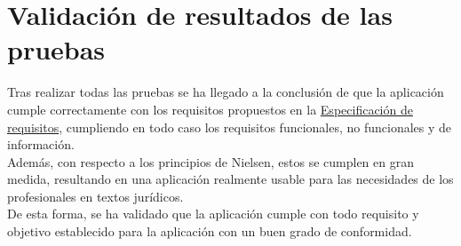 \section{Validación de resultados de las pruebas}

Tras realizar todas las pruebas se ha llegado a la conclusión de que la aplicación cumple correctamente con los requisitos propuestos en la \hyperref[enlaceespecificacion]{Especificación de requisitos}, cumpliendo en todo caso los requisitos funcionales, no funcionales y de información.
\\

Además, con respecto a los principios de Nielsen, estos se cumplen en gran medida, resultando en una aplicación realmente usable para las necesidades de los profesionales en textos jurídicos.
\\

De esta forma, se ha validado que la aplicación cumple con todo requisito y objetivo establecido para la aplicación con un buen grado de conformidad.
